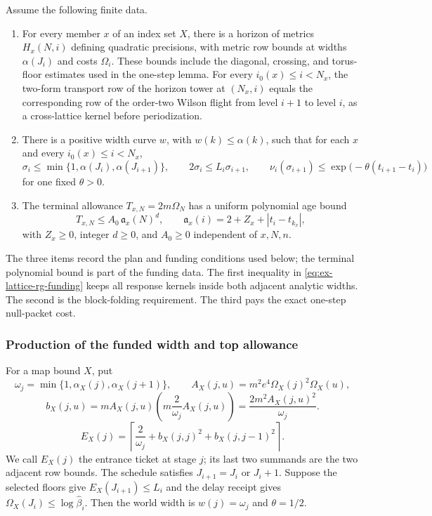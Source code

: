 Assume the following finite data.

\begin{enumerate}
\item For every member $x$ of an index set $X$, there is a horizon of
metrics $H_x(N,i)$ defining quadratic precisions, with metric row bounds at widths
$\alpha(J_i)$ and costs $\Omega_i$. These bounds include the diagonal,
crossing, and torus-floor estimates used in the one-step lemma. For every
$i_0(x)\leq i<N_x$, the two-form transport row of the horizon tower at
$(N_x,i)$ equals the corresponding row of the order-two Wilson flight
from level $i+1$ to level $i$, as a cross-lattice kernel before
periodization.
\item There is a positive width curve $w$, with
$w(k)\leq\alpha(k)$, such that for each $x$ and every
$i_0(x)\leq i<N_x$,
\begin{equation}
 \sigma_i\leq\min\{1,\alpha(J_i),\alpha(J_{i+1})\},\qquad
 2\sigma_i\leq L_i\sigma_{i+1},\qquad
 \nu_i(\sigma_{i+1})\leq
 \exp\bigl(-\theta(t_{i+1}-t_i)\bigr)
 \label{eq:ex-lattice-rg-funding}
\end{equation}
for one fixed $\theta>0$.
\item The terminal allowance
$T_{x,N}=2m\Omega_N$ has a uniform polynomial age bound
\begin{equation}
 T_{x,N}\leq A_0\,\mathfrak a_x(N)^d,
 \qquad
 \mathfrak a_x(i)=2+Z_x+|t_i-t_{k_x}|,
 \label{eq:ex-lattice-rg-topcap}
\end{equation}
with $Z_x\geq0$, integer $d\geq0$, and $A_0\geq0$ independent of
$x,N,n$.
\end{enumerate}

The three items record the plan and funding conditions used below; the
terminal polynomial bound is part of the funding data. The first inequality in
\eqref{eq:ex-lattice-rg-funding} keeps all response kernels inside both
adjacent analytic widths. The second is the block-folding requirement. The
third pays the exact one-step null-packet cost.

\subsubsection{Production of the funded width and top allowance}
\label{subsec:ex-lattice-rg-funded-producer}

For a map bound $X$, put
\[
 \omega_j=\min\{1,\alpha_X(j),\alpha_X(j+1)\},\qquad
 A_X(j,u)=m^2e^4\Omega_X(j)^2\Omega_X(u),
\]
\[
 b_X(j,u)=m A_X(j,u)\left(m\frac{2}{\omega_j}A_X(j,u)\right)
       =\frac{2m^2A_X(j,u)^2}{\omega_j}.
\]
\[
 E_X(j)=\left\lceil\frac{2}{\omega_j}+b_X(j,j)^2+b_X(j,j-1)^2\right\rceil.
\]
We call $E_X(j)$ the entrance ticket at stage $j$; its last two summands
are the two adjacent row bounds. The
schedule satisfies $J_{i+1}=J_i$ or $J_i+1$. Suppose the selected floors
give $E_X(J_{i+1})\leq L_i$ and the delay receipt gives
$\Omega_X(J_i)\leq\log\widehat\beta_i$. Then the world width is
$w(j)=\omega_j$ and $\theta=1/2$.

